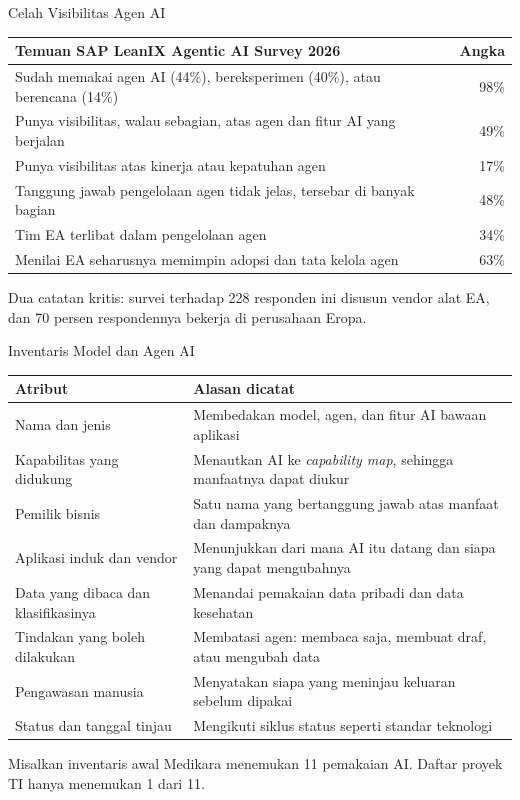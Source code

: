 \documentclass[aspectratio=169, table, 12pt]{beamer}
\begin{document}
\begin{frame}{{\Large Celah Visibilitas Agen AI}}
  \footnotesize
  \begin{tabularx}{\textwidth}{Xr}
    \hline
    \textbf{Temuan SAP LeanIX Agentic AI Survey 2026} & \textbf{Angka} \\
    \hline
    Sudah memakai agen AI (44\%), bereksperimen (40\%), atau berencana (14\%) & 98\% \\
    \hline
    Punya visibilitas, walau sebagian, atas agen dan fitur AI yang berjalan & 49\% \\
    \hline
    Punya visibilitas atas kinerja atau kepatuhan agen & 17\% \\
    \hline
    Tanggung jawab pengelolaan agen tidak jelas, tersebar di banyak bagian & 48\% \\
    \hline
    Tim EA terlibat dalam pengelolaan agen & 34\% \\
    \hline
    Menilai EA seharusnya memimpin adopsi dan tata kelola agen & 63\% \\
    \hline
  \end{tabularx}

  \vspace{6pt}
  \small Dua catatan kritis: survei terhadap 228 responden ini disusun vendor alat EA, dan 70 persen
  respondennya bekerja di perusahaan Eropa.
\end{frame}

\begin{frame}{{\Large Inventaris Model dan Agen AI}}
  \scriptsize
  \begin{tabularx}{\textwidth}{L{4.2cm}Y}
    \hline
    \textbf{Atribut} & \textbf{Alasan dicatat} \\
    \hline
    Nama dan jenis & Membedakan model, agen, dan fitur AI bawaan aplikasi \\
    \hline
    Kapabilitas yang didukung & Menautkan AI ke \textit{capability map}, sehingga manfaatnya dapat diukur \\
    \hline
    Pemilik bisnis & Satu nama yang bertanggung jawab atas manfaat dan dampaknya \\
    \hline
    Aplikasi induk dan vendor & Menunjukkan dari mana AI itu datang dan siapa yang dapat mengubahnya \\
    \hline
    Data yang dibaca dan klasifikasinya & Menandai pemakaian data pribadi dan data kesehatan \\
    \hline
    Tindakan yang boleh dilakukan & Membatasi agen: membaca saja, membuat draf, atau mengubah data \\
    \hline
    Pengawasan manusia & Menyatakan siapa yang meninjau keluaran sebelum dipakai \\
    \hline
    Status dan tanggal tinjau & Mengikuti siklus status seperti standar teknologi \\
    \hline
  \end{tabularx}

  \vspace{6pt}
  \small Misalkan inventaris awal Medikara menemukan 11 pemakaian AI. Daftar proyek TI hanya menemukan
  1 dari 11.
\end{frame}
\end{document}
